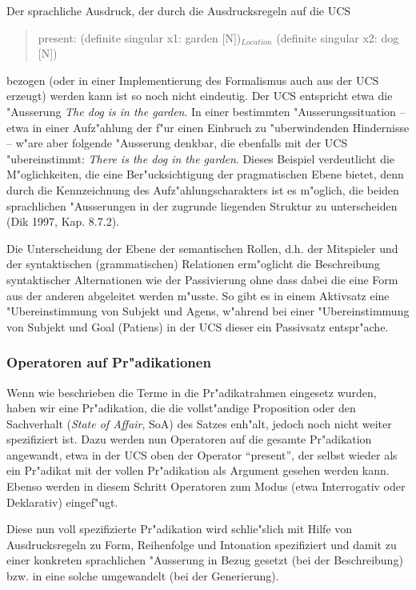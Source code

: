\documentclass[a4paper]{article}
\begin{document}
Der sprachliche Ausdruck, der durch die Ausdrucksregeln auf die UCS

\begin{quote}
present: (definite singular x1: garden [N])$_{Location}$ (definite singular x2:
dog [N])
\end{quote}

bezogen (oder in einer Implementierung des Formalismus auch aus der UCS
erzeugt) werden kann ist so noch nicht eindeutig. Der UCS entspricht etwa die
"Ausserung \emph{The dog is in the garden}. In einer bestimmten
"Ausserungssituation -- etwa in einer Aufz"ahlung der f"ur einen Einbruch zu
"uberwindenden Hindernisse -- w"are aber folgende "Ausserung denkbar, die
ebenfalls mit der UCS "ubereinstimmt: \emph{There is the dog in the garden}.
Dieses Beispiel verdeutlicht die M"oglichkeiten, die eine Ber"ucksichtigung der
pragmatischen Ebene bietet, denn durch die Kennzeichnung des
Aufz"ahlungscharakters ist es m"oglich, die beiden sprachlichen "Ausserungen in
der zugrunde liegenden Struktur zu unterscheiden (Dik 1997, Kap. 8.7.2).

Die Unterscheidung der Ebene der semantischen Rollen, d.h. der Mitspieler und
der syntaktischen (grammatischen) Relationen erm"oglicht die Beschreibung
syntaktischer Alternationen wie der Passivierung ohne dass dabei die eine Form
aus der anderen abgeleitet werden m"usste. So gibt es in einem Aktivsatz eine
"Ubereinstimmung von Subjekt und Agens, w"ahrend bei einer "Ubereinstimmung von
Subjekt und Goal (Patiens) in der UCS dieser ein Passivsatz entspr"ache.

\subsubsection{Operatoren auf Pr"adikationen}

Wenn wie beschrieben die Terme in die Pr"adikatrahmen eingesetz wurden, haben
wir eine Pr"adikation, die die vollst"andige Proposition oder den Sachverhalt
(\emph{State of Affair}, SoA) des Satzes enh"alt, jedoch noch nicht weiter
spezifiziert ist. Dazu werden nun Operatoren auf die gesamte Pr"adikation
angewandt, etwa in der UCS oben der Operator ``present'', der selbst wieder als
ein Pr"adikat mit der vollen Pr"adikation als Argument gesehen werden kann.
Ebenso werden in diesem Schritt Operatoren zum Modus (etwa Interrogativ oder
Deklarativ) eingef"ugt.

Diese nun voll spezifizierte Pr"adikation wird schlie"slich mit Hilfe von
Ausdrucksregeln zu Form, Reihenfolge und Intonation spezifiziert und damit zu
einer konkreten sprachlichen "Ausserung in Bezug gesetzt (bei der Beschreibung)
bzw. in eine solche umgewandelt (bei der Generierung).
\end{document}
